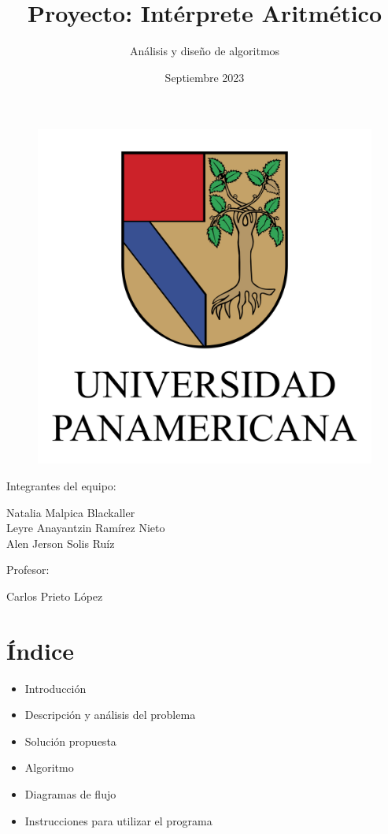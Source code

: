 \documentclass{article}
\begin{document}
 
\title{Proyecto: Intérprete Aritmético}
\author{Análisis y diseño de algoritmos} 
\date{Septiembre 2023}

\maketitle
\begin{figure}[h] 
	\centering 	\includegraphics[width=0.5\linewidth]{Escudo UP.png}
	\label{fig:Gráfica 3}
\end{figure}

\begin{center}
\Large Integrantes del equipo:\\
\end{center}

\begin{center}
\large Natalia Malpica Blackaller \\
\large Leyre Anayantzin Ramírez Nieto \\
\large Alen Jerson Solis Ruíz
\end{center}

\begin{center}
    \Large Profesor:
\end{center}

 \begin{center}
     \large Carlos Prieto López
 \end{center}
 
\pagebreak
\section{Índice}

\begin{itemize}
    \item Introducción
    \item Descripción y análisis del problema
    \item Solución propuesta
    \item Algoritmo
    \item Diagramas de flujo
    \item Instrucciones para utilizar el programa
\end{itemize}
\end{document}

